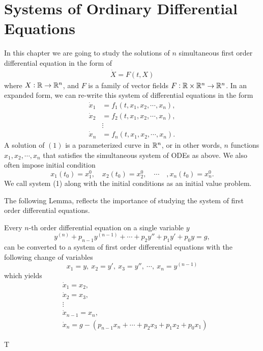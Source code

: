 \chapter{Systems of Ordinary Differential Equations}

In this chapter we are going to study the solutions of $ n $ simultaneous first order differential equation in the form of 
\begin{align*}
	\dot{X} = F(t,X)
\end{align*}
where $ X: \mathbb{R} \to \mathbb{R}^n $, and $ F $ is a family of vector fields $ F: \mathbb{R} \times\mathbb{R}^n \to \mathbb{R}^n $. In an expanded form, we can re-write this system of differential equations in the form
\begin{align*}
	\dot{x}_1 &= f_1(t,x_1,x_2,\cdots,x_n),\\
	\dot{x}_2 &= f_2(t,x_1,x_2,\cdots,x_n),\\
	&\vdots\\
	\dot{x}_n &= f_n(t,x_1,x_2,\cdots,x_n).
	\tag{1}
\end{align*} 
A solution of $ (1) $ is a parameterized curve in $ \mathbb{R}^n $, or in other words, $ n $ functions $ x_1, x_2, \cdots, x_n $ that satisfies the simultaneous system of ODEs as above. We also often impose initial condition 
\[x_1(t_0)=x_1^0,\quad x_2(t_0)=x_2^0, \quad \cdots \quad ,x_n(t_0) = x_n^0. \]
 We call system (1) along with the initial conditions as an initial value problem.
 
 The following Lemma, reflects the importance of studying the system of first order differential equations.
 \begin{lemma}
 	Every $ n $-th order differential equation on a single variable $ y $ 
 	\[ y^{(n)} + p_{n-1}y^{(n-1)} + \cdots + p_2 y'' + p_1y' + p_0 y = g, \]
 	can be converted to a system of first order differential equations with the following change of variables
 	\[ x_1 = y,\ x_2 = y',\ x_3 = y'',\ \cdots,\ x_{n} = y^{(n-1)} \]
 	which yields
 	\begin{align*}
 		&\dot{x}_1 = x_2,\\
 		&\dot{x}_2 = x_3,\\
 		&\vdots \\
 		&\dot{x}_{n-1} = x_n, \\
 		&\dot{x}_n = g - (p_{n-1}x_n + \cdots + p_2 x_3 + p_1x_2 + p_0 x_1)
 	\end{align*}
 \end{lemma}

T